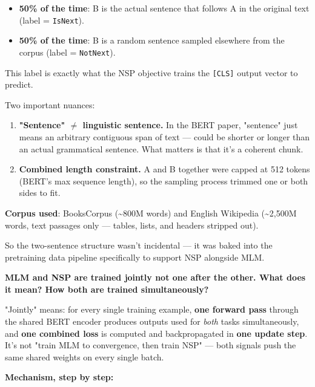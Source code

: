 \begin{itemize}
\item \textbf{50\% of the time}: B is the actual sentence that follows A in the original text (label = \texttt{IsNext}).
\item \textbf{50\% of the time}: B is a random sentence sampled elsewhere from the corpus (label = \texttt{NotNext}).
\end{itemize}

This label is exactly what the NSP objective trains the \texttt{[CLS]} output vector to predict.

Two important nuances:

\begin{enumerate}
\item \textbf{"Sentence" $\neq$ linguistic sentence.} In the BERT paper, "sentence" just means an arbitrary contiguous span of text --- could be shorter or longer than an actual grammatical sentence. What matters is that it's a coherent chunk.
\item \textbf{Combined length constraint.} A and B together were capped at 512 tokens (BERT's max sequence length), so the sampling process trimmed one or both sides to fit.
\end{enumerate}

\textbf{Corpus used}: BooksCorpus (\textasciitilde{}800M words) and English Wikipedia (\textasciitilde{}2,500M words, text passages only --- tables, lists, and headers stripped out).

So the two-sentence structure wasn't incidental --- it was baked into the pretraining data pipeline specifically to support NSP alongside MLM.

\textbf{MLM and NSP are trained jointly not one after the other. What does it mean? How both are trained simultaneously?}

"Jointly" means: for every single training example, \textbf{one forward pass} through the shared BERT encoder produces outputs used for \textit{both} tasks simultaneously, and \textbf{one combined loss} is computed and backpropagated in \textbf{one update step}. It's not "train MLM to convergence, then train NSP" --- both signals push the same shared weights on every single batch.

\textbf{Mechanism, step by step:}

